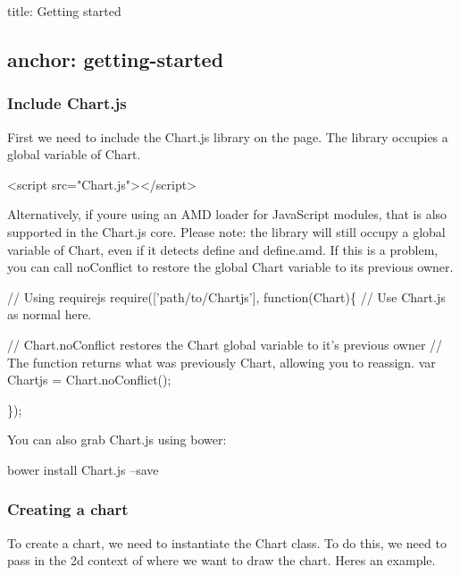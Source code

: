 

 title\+: Getting started \subsection*{anchor\+: getting-\/started }

\subsubsection*{Include Chart.\+js}

First we need to include the Chart.\+js library on the page. The library occupies a global variable of {\ttfamily Chart}.


\begin{DoxyCode}
<script src="Chart.js"></script>
\end{DoxyCode}


Alternatively, if you\textquotesingle{}re using an A\+MD loader for Java\+Script modules, that is also supported in the Chart.\+js core. Please note\+: the library will still occupy a global variable of {\ttfamily Chart}, even if it detects {\ttfamily define} and {\ttfamily define.\+amd}. If this is a problem, you can call {\ttfamily no\+Conflict} to restore the global Chart variable to it\textquotesingle{}s previous owner.


\begin{DoxyCode}
// Using requirejs
require(['path/to/Chartjs'], function(Chart)\{
    // Use Chart.js as normal here.

    // Chart.noConflict restores the Chart global variable to it's previous owner
    // The function returns what was previously Chart, allowing you to reassign.
    var Chartjs = Chart.noConflict();

\});
\end{DoxyCode}


You can also grab Chart.\+js using bower\+:


\begin{DoxyCode}
bower install Chart.js --save
\end{DoxyCode}


\subsubsection*{Creating a chart}

To create a chart, we need to instantiate the {\ttfamily Chart} class. To do this, we need to pass in the 2d context of where we want to draw the chart. Here\textquotesingle{}s an example.


